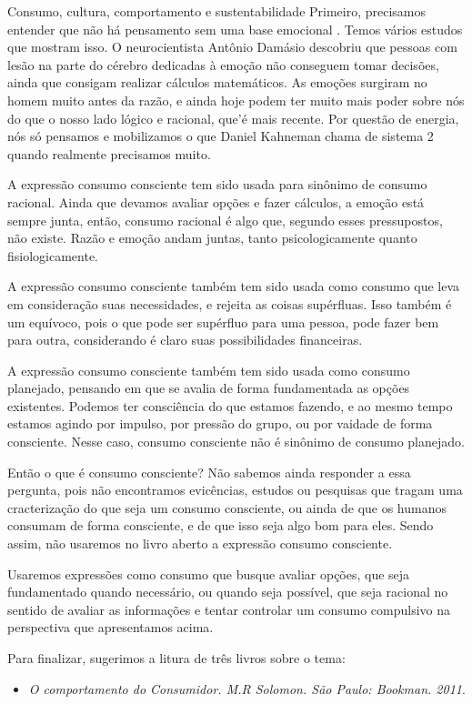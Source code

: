 \begin{paginatexto}{Consumo, cultura, comportamento e sustentabilidade}
Primeiro, precisamos entender que não há pensamento sem uma base emocional \citep{ferreira2008}. Temos vários estudos que mostram isso. O neurocientista Antônio Damásio descobriu que pessoas com lesão na parte do cérebro dedicadas à emoção não conseguem tomar decisões, ainda que consigam realizar cálculos matemáticos. As emoções surgiram no homem muito antes da razão, e ainda hoje podem ter muito mais poder sobre nós do que o nosso lado lógico e racional, que'é mais recente. Por questão de energia, nós só pensamos e mobilizamos o que Daniel Kahneman chama de sistema 2 quando realmente precisamos muito.

A expressão consumo consciente tem sido usada para sinônimo de consumo racional. Ainda que devamos avaliar opções e fazer cálculos, a emoção está sempre junta, então, consumo racional é algo que, segundo esses pressupostos, não existe. Razão e emoção andam juntas, tanto psicologicamente quanto fisiologicamente.

A expressão consumo consciente também tem sido usada como consumo que leva em consideração suas necessidades, e rejeita as coisas supérfluas. Isso também é um equívoco, pois o que pode ser supérfluo para uma pessoa, pode fazer bem para outra, considerando é claro suas possibilidades financeiras.

A expressão consumo consciente também tem sido usada como consumo planejado, pensando em que se avalia de forma fundamentada as opções existentes. Podemos ter consciência do que estamos fazendo, e ao mesmo tempo estamos agindo por impulso, por pressão do grupo, ou por vaidade de forma consciente. Nesse caso, consumo consciente não é sinônimo de consumo planejado.

Então o que é consumo consciente? Não sabemos ainda responder a essa pergunta, pois não encontramos evicências, estudos ou pesquisas que tragam uma cracterização do que seja um consumo consciente, ou ainda de que os humanos consumam de forma consciente, e de que isso seja algo bom para eles. Sendo assim, não usaremos no livro aberto a expressão consumo consciente.

Usaremos expressões como consumo que busque avaliar opções, que seja fundamentado quando necessário, ou quando seja possível, que seja racional no sentido de avaliar as informações e tentar controlar um consumo compulsivo na perspectiva que apresentamos acima.


   Para finalizar, sugerimos a litura de três livros sobre o tema:
  \begin{itemize}
    \item \textit{O comportamento do Consumidor. M.R Solomon. São Paulo: Bookman. 2011}.


\end{itemize}
\end{paginatexto}
